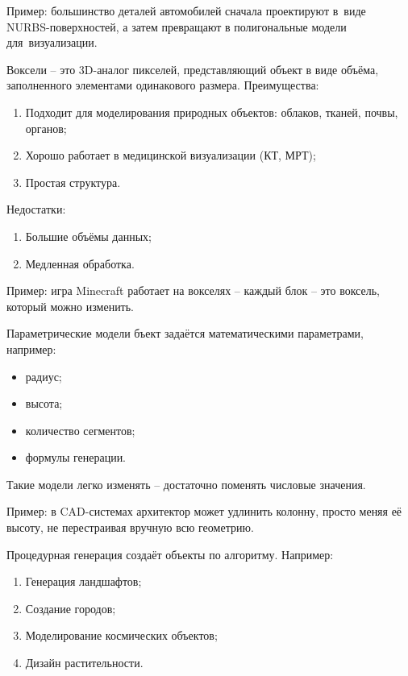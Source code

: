 \documentclass{ou}
\begin{document}
Пример: большинство деталей автомобилей сначала проектируют в~виде NURBS-поверхностей, а затем превращают в полигональные модели для~визуализации.

Воксели -- это 3D-аналог пикселей, представляющий объект в виде объёма, заполненного элементами одинакового размера. Преимущества:
\begin{enumerate}[leftmargin=0em, itemindent=3.75em, nosep, label=\arabic*)]
\item Подходит для моделирования природных объектов: облаков, тканей, почвы, органов;
\item Хорошо работает в медицинской визуализации (КТ, МРТ);
\item Простая структура.
\end{enumerate}

Недостатки:
\begin{enumerate}[leftmargin=0em, itemindent=3.75em, nosep, label=\arabic*)]
\item Большие объёмы данных;
\item Медленная обработка.
\end{enumerate}

Пример: игра Minecraft работает на вокселях -- каждый блок -- это воксель, который можно изменить.

Параметрические модели бъект задаётся математическими параметрами, например:
\begin{itemize}[label=-, leftmargin=0em, itemindent=3.35em, nosep]
\item радиус;
\item высота;
\item количество сегментов;
\item формулы генерации.
\end{itemize}

Такие модели легко изменять -- достаточно поменять числовые значения.

Пример: в CAD-системах архитектор может удлинить колонну, просто меняя её высоту, не перестраивая вручную всю геометрию.

Процедурная генерация создаёт объекты по алгоритму. Например:
\begin{enumerate}[leftmargin=0em, itemindent=3.75em, nosep, label=\arabic*)]
\item Генерация ландшафтов;
\item Создание городов;
\item Моделирование космических объектов;
\item Дизайн растительности.
\end{enumerate}
\end{document}
